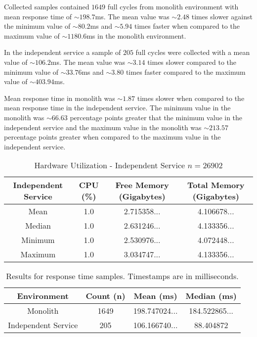 Collected samples contained $1649$ full cycles from monolith environment with mean response time of $\sim198.7$ms.
The mean value was $\sim2.48$ times slower against the minimum value of $\sim 80.2$ms and $\sim5.94$ times faster when compared to the maximum value of $\sim1180.6$ms in the monolith environment.

In the independent service a sample of $205$ full cycles were collected with a mean value of $\sim106.2$ms.
The mean value was $\sim3.14$ times slower compared to the minimum value of $\sim 33.76$ms and $\sim3.80$ times faster compared to the maximum value of $\sim 403.94$ms.

Mean response time in monolith was $\sim1.87$ times slower when compared to the mean response time in the independent service.
The minimum value in the monolith was $\sim 66.63$ percentage points greater that the minimum value in the independent service and the maximum value in the monolith was $\sim 213.57$ percentage points greater when compared to the maximum value in the independent service.

\begin{table}[ht!]
       \begin{tabular}{|c c c c|} 
        \hline
        Independent Service
        & CPU (\%)
        & Free Memory (Gigabytes)
        & Total Memory (Gigabytes) \\ [0.5ex] 
        
        \hline\hline
        Mean
        & 1.0
        & 2.715358... 
        & 4.106678...
        \\
        
        Median
        & 1.0
        & 2.631246...
        & 4.133356...
        \\ 

        Minimum
        & 1.0
        & 2.530976...
        & 4.072448...
        \\ 
        
        Maximum
        & 1.0
        & 3.034747...
        & 4.133356...
        \\
        \hline
    \end{tabular}
    \caption{Hardware Utilization - Independent Service $n=26902$}
    \label{table:hardware results:independent service:1}
\end{table}

\begin{table}[ht!]
    \begin{tabular}{|c c c c|} 
        \hline
        Environment
        & Count (n)
        & Mean (ms)
        & Median (ms)
        \\ [0.5ex] 
        
        \hline\hline
        Monolith
        & 1649
        & 198.747024...
        & 184.522865...
        \\ 
        
        Independent Service
        & 205
        & 106.166740...
        & 88.404872
        \\
        \hline
    \end{tabular}
    \caption{Results for response time samples. Timestamps are in milliseconds.}
    \label{table:response time results:1}
\end{table}

